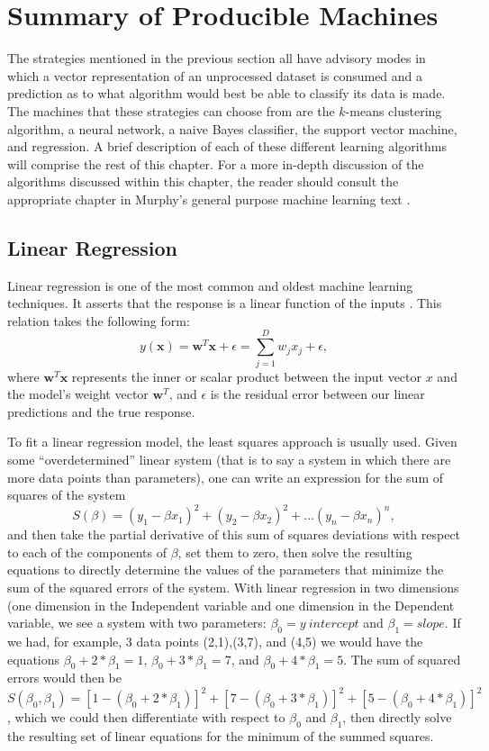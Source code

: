 \section{Summary of Producible Machines}
The strategies mentioned in the previous section all have advisory modes in which
a vector representation of an unprocessed dataset is consumed and a
prediction as to what algorithm would best be able to classify its data is made.
The machines that these strategies can choose from are the $k$-means clustering
algorithm, a neural network, a naive Bayes classifier, the support
vector machine, and regression. A brief description of each of these different
learning algorithms will comprise the rest of this chapter. For a more in-depth
discussion of the algorithms discussed within this chapter, the reader should consult
the appropriate chapter in Murphy's general purpose machine learning text
\cite{Murphy}.
\subsection{Linear Regression}
Linear regression is one of the most common and oldest machine learning
techniques. It asserts that the response is a linear function
of the inputs \cite{Murphy}. This relation takes the following form:
$$ y(\textbf{x}) = \textbf{w}^T\textbf{x} + \epsilon = \sum_{j=1}^{D}w_jx_j + \epsilon,$$
where $\textbf{w}^T\textbf{x}$ represents the inner or scalar product between the input vector $x$
and the model's weight vector $\textbf{w}^T$, and $\epsilon$ is the residual error
between our linear predictions and the true response.

To fit a linear regression model, the least squares approach is usually used.
Given some  ``overdetermined'' linear system (that is to say a system in which
there are more data points than parameters), one can write an expression for the
sum of squares of the system
$$S(\beta) = (y_1 - \beta x_1)^2 + (y_2 - \beta x_2)^2 + ... (y_n - \beta x_n)^n,$$
and then take the partial derivative of this sum of squares deviations with respect
to each of the components of $\beta$, set them to zero, then solve the resulting
equations to directly determine the values of the parameters that
minimize the sum of the squared errors of the system. With linear regression in
two dimensions (one dimension in the Independent variable and one dimension in
the Dependent variable, we see a system with two parameters:
$\beta_0 = y~intercept$ and $\beta_1 = slope$. If we had, for example, 3 data
points (2,1),(3,7), and (4,5) we would have the equations
$\beta_0 + 2*\beta_1 = 1$, $\beta_0 + 3*\beta_1 = 7$, and
$\beta_0 + 4*\beta_1 = 5$. The sum of squared errors would then be
 $S(\beta_0,\beta_1)= [1 - (\beta_0 + 2*\beta_1)]^2 + [7 - (\beta_0 + 3*\beta_1)]^2 + [5 - (\beta_0 + 4*\beta_1)]^2$
, which we could then differentiate with respect to $\beta_0$ and $\beta_1$, then
directly solve the resulting set of linear equations for the minimum of
the summed squares.

